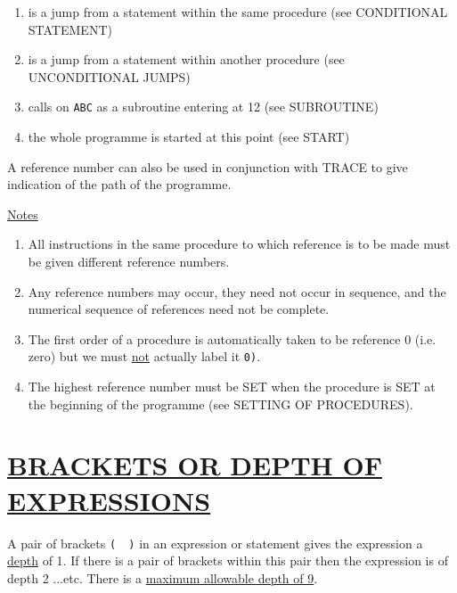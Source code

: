 \documentclass[10pt, a4paper, oneside]{article}
\newcommand{\myuline}[1]{\uline{#1}}
\newcommand{\mytt}[1]{\texttt{\scriptsize #1}}
\newcommand{\mytt}[1]{\texttt{\small #1}}
\begin{document}
\begin{multicols}{2}
\begin{enumerate}
\item is a jump from a statement within the same
procedure (see CONDITIONAL STATEMENT)

\item is a jump from a statement within another
procedure (see UNCONDITIONAL JUMPS)

\item calls on \mytt{ABC} as a subroutine entering at 12
(see SUBROUTINE)

\item the whole programme is started at this point
(see START)
\end{enumerate}

A reference number can also be used in conjunction
with TRACE to give indication of the path of the
programme.

\begin{flushleft}
\myuline{Notes}
\end{flushleft}

\renewcommand{\labelenumi}{(\roman{enumi})}\begin{enumerate}
\def\theenumi{\roman{enumi}}

\item All instructions in the same procedure to which
reference is to be made must be given different
reference numbers.

\item Any reference numbers may occur, they need not
occur in sequence, and the numerical sequence of
references need not be complete.

\item The first order of a procedure is automatically
taken to be reference 0 (i.e. zero) but we must \myuline{not}
actually label it \mytt{0)}.

\item The highest reference number must be SET when the
procedure is SET at the beginning of the programme
(see SETTING OF PROCEDURES).
\end{enumerate}


\section{\myuline{BRACKETS OR DEPTH OF EXPRESSIONS}}

A pair of brackets \mytt{(\ \ )} in an expression or
statement gives the expression a \myuline{depth} of 1.  If there
is a pair of brackets within this pair then the
expression is of depth 2 ...etc.  There is a \myuline{maximum
allowable depth of 9}.


\end{multicols}
\end{document}
